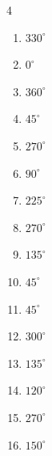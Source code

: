 \begin{multicols}{4}
\begin{enumerate}
  \item $\displaystyle 330^{\circ}$

  \item $\displaystyle 0^{\circ}$
        \phantom{$\displaystyle =0$}

  \item $\displaystyle 360^{\circ}$
        \phantom{$\displaystyle =2\pi$}

\columnbreak %

  \item $\displaystyle 45^{\circ}$

  \item $\displaystyle 270^{\circ}$

  \item $\displaystyle 90^{\circ}$

  \item $\displaystyle 225^{\circ}$

  \item $\displaystyle 270^{\circ}$

  \item $\displaystyle 135^{\circ}$

  \item $\displaystyle 45^{\circ}$

  \item $\displaystyle 45^{\circ}$

  \item $\displaystyle 300^{\circ}$

  \item $\displaystyle 135^{\circ}$

  \item $\displaystyle 120^{\circ}$

  \item $\displaystyle 270^{\circ}$

  \item $\displaystyle 150^{\circ}$


\end{enumerate}
\end{multicols}
